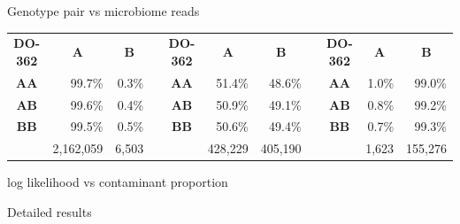 \documentclass[aspectratio=169,12pt,t]{beamer}
\begin{document}
\begin{frame}{Genotype pair vs microbiome reads}
{{\begin{tabular}{c|r|r|cc|r|r|cc|r|r|}
        \multicolumn{1}{c}{\textbf{DO-362}}&
                 \multicolumn{1}{c}{\textbf{A}}&\multicolumn{1}{c}{\textbf{B}} &&
        \multicolumn{1}{c}{\textbf{DO-362}}&
                 \multicolumn{1}{c}{\textbf{A}}&\multicolumn{1}{c}{\textbf{B}} &&
        \multicolumn{1}{c}{\textbf{DO-362}}&
                 \multicolumn{1}{c}{\textbf{A}}&\multicolumn{1}{c}{\textbf{B}} \\
        \cline{2-3}\cline{6-7}\cline{10-11}
      \textbf{AA} & 99.7\% &  0.3\% &&
      \textbf{AA} & 51.4\% & 48.6\%  &&
      \textbf{AA} &  1.0\% & 99.0\% \\
        \cline{2-3}\cline{6-7}\cline{10-11}

      \textbf{AB} & 99.6\% &  0.4\% &&
      \textbf{AB} & 50.9\% & 49.1\%  &&
      \textbf{AB} &  0.8\% & 99.2\%  \\
        \cline{2-3}\cline{6-7}\cline{10-11}

      \textbf{BB} & 99.5\% &  0.5\% &&
      \textbf{BB} & 50.6\% & 49.4\% &&
      \textbf{BB} &  0.7\% & 99.3\% \\
        \cline{2-3}\cline{6-7}\cline{10-11}

    \multicolumn{1}{c}{} & \multicolumn{1}{c}{\color{white} 2,162,059}
                & \multicolumn{1}{c}{\color{white} 6,503} &&
    \multicolumn{1}{c}{} & \multicolumn{1}{c}{\color{white} 428,229}
                & \multicolumn{1}{c}{\color{white} 405,190} &&
    \multicolumn{1}{c}{} & \multicolumn{1}{c}{\color{white} 1,623}
                & \multicolumn{1}{c}{\color{white} 155,276}
  \end{tabular} }
}

\note{
}

\end{frame}



\begin{frame}[c]{log likelihood vs contaminant proportion}


\note{
}

\end{frame}




\begin{frame}[c]{Detailed results}


\note{
}

\end{frame}
\end{document}
